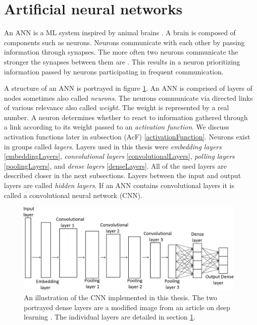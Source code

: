 \section{Artificial neural networks} \label{artificialNeuralNetworks}
An ANN is a ML system inspired by animal brains \cite{machineLeraningApproaches}. A brain is composed of components such as neurons. Neurons communicate with each other by passing information through synapses. The more often two neurons communicate the stronger the synapses between them are \cite{neuronsInBrain}. This results in a neuron prioritizing information passed by neurons participating in frequent communication. 

A structure of an ANN is portrayed in figure \ref{structureOfCNN}. An ANN is comprised of layers of nodes sometimes also called \textit{neurons}. The neurons communicate via directed links of various relevance also called \textit{weight}. The weight is represented by a real number. A neuron determines whether to react to information gathered through a link according to its weight passed to an \textit{activation function}. We discuss activation functions later in subsection (AcF) \ref{activationFunction}. Neurons exist in groups called \textit{layers}. Layers used in this thesis were \textit{embedding layers} \ref{embeddingLayers}, \textit{convolutional layers} \ref{convolutionalLayers}, \textit{polling layers} \ref{poolingLayers}, and \textit{dense layers} \ref{denseLayers}. All of the used layers are described closer in the next subsections. Layers between the input and output layers are called \textit{hidden layers}. If an ANN contains convolutional layers it is called a convolutional neural network (CNN).
\begin{figure}[ht!]
  \centering
  \includegraphics[width=\textwidth]{Images/structureOfCNN.png}
  \caption{An illustration of the CNN implemented in this thesis. The two portrayed dense layers are a modified image from an article on deep learning \cite{structureOfCNN}. The individual layers are detailed in section \ref{artificialNeuralNetworks}.} 
  \label{structureOfCNN}
\end{figure} 

